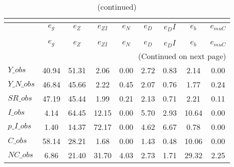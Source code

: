  
\begin{center}
\begin{longtable}{lcccccccc} 
\caption{VARIANCE DECOMPOSITION (in percent)}\\
 \label{Table:th_var_decomp_uncond}\\
\toprule 
$               $	 & 	 $        {e_g}$	 & 	 $        {e_Z}$	 & 	 $     {e_{ZI}}$	 & 	 $        {e_N}$	 & 	 $        {e_D}$	 & 	 $       {e_DI}$	 & 	 $        {e_b}$	 & 	 $    {e_{muC}}$\\
\midrule \endfirsthead 
\caption{(continued)}\\
 \toprule \\ 
$               $	 & 	 $        {e_g}$	 & 	 $        {e_Z}$	 & 	 $     {e_{ZI}}$	 & 	 $        {e_N}$	 & 	 $        {e_D}$	 & 	 $       {e_DI}$	 & 	 $        {e_b}$	 & 	 $    {e_{muC}}$\\
\midrule \endhead 
\midrule \multicolumn{9}{r}{(Continued on next page)} \\ \bottomrule \endfoot 
\bottomrule \endlastfoot 
$Y\_obs         $	 & 	        40.94	 & 	        51.31	 & 	         2.06	 & 	         0.00	 & 	         2.72	 & 	         0.83	 & 	         2.14	 & 	         0.00 \\ 
$Y\_N\_obs      $	 & 	        46.84	 & 	        45.66	 & 	         2.22	 & 	         0.45	 & 	         2.07	 & 	         0.76	 & 	         1.77	 & 	         0.24 \\ 
$SR\_obs        $	 & 	        47.19	 & 	        45.44	 & 	         1.99	 & 	         0.21	 & 	         2.13	 & 	         0.71	 & 	         2.21	 & 	         0.11 \\ 
$I\_obs         $	 & 	         4.14	 & 	        64.45	 & 	        12.15	 & 	         0.00	 & 	         5.70	 & 	         2.93	 & 	        10.64	 & 	         0.00 \\ 
$p\_I\_obs      $	 & 	         1.40	 & 	        14.37	 & 	        72.17	 & 	         0.00	 & 	         4.62	 & 	         6.67	 & 	         0.78	 & 	         0.00 \\ 
$C\_obs         $	 & 	        58.14	 & 	        28.21	 & 	         1.68	 & 	         0.00	 & 	         1.43	 & 	         0.48	 & 	        10.06	 & 	         0.00 \\ 
$NC\_obs        $	 & 	         6.86	 & 	        21.40	 & 	        31.70	 & 	         4.03	 & 	         2.73	 & 	         1.71	 & 	        29.32	 & 	         2.25 \\ 

\end{longtable}
\end{center}
